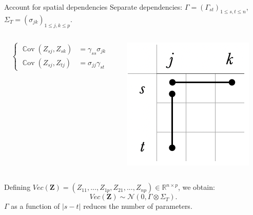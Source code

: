 \documentclass[11pt]{beamer}
\DeclareMathOperator*{\Cov}{\mathbb{C}\text{ov}}
\newcommand{\Zbf}{{\boldsymbol{Z}}}
\newcommand{\emphase}[1]{\textcolor{Complement}{#1}}
\newcommand{\Ncal}{\mathcal{N}}
\begin{document}
  \begin{frame}{Account for spatial dependencies}
Separate dependencies: \emphase{$\Gamma=(\Gamma_{st})_{1\leq s,t\leq n}$}, $\Sigma_T=(\sigma_{jk})_{1\leq j,k\leq p}$.
\begin{columns}
\begin{column}{0.6\linewidth}
\begin{center}
\begin{equation*}
\left\{
\begin{array}{ll}
\Cov{(Z_{sj},Z_{sk})}& = \gamma_{ss} \sigma_{jk}\\
\Cov{(Z_{sj},Z_{tj})} &=  \sigma_{jj}\gamma_{st}
\end{array}\right.
\end{equation*}
\end{center}
\vspace{0.5cm}
\end{column}
\begin{column}{0.4\linewidth}
\includegraphics[width=0.4\linewidth]{images/spatial.png}
\end{column}
\end{columns}

 Defining $Vec(\Zbf) = (Z_{11},..., Z_{1p},Z_{21},...,Z_{np}) \in \mathds{R}^{n\times p}$, we obtain:
$$Vec(\Zbf) \sim \Ncal(0,\Gamma \otimes \Sigma_T).$$ 
$\Gamma$ as a function of $| s-t|$ reduces the number of parameters.
 \end{frame}
\end{document}

